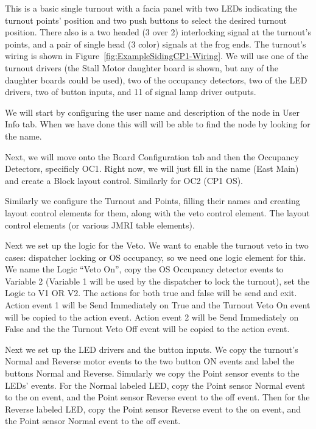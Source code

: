 This is a basic single turnout with a facia panel with two LEDs indicating the
turnout points' position and two push buttons to select the desired turnout
position. There also is a two headed (3 over 2) interlocking signal at the
turnout's points, and a pair of single head (3 color) signals at the frog
ends. The turnout's wiring is shown in 
Figure~\ref{fig:ExampleSidingCP1-Wiring}. We will use one of the turnout 
drivers (the Stall Motor daughter board is shown, but any of the daughter 
boards could be used), two of the occupancy detectors, two of the LED drivers, 
two of button inputs, and 11 of signal lamp driver outputs.

We will start by configuring the user name and description of the node in User 
Info tab.  When we have done this will will be able to find the node by 
looking for the name.  

Next, we will move onto the Board Configuration tab and then the Occupancy
Detectors, specificly OC1. Right now, we will just fill in the name (East
Main) and create a Block layout control. Similarly for OC2 (CP1 OS).

Similarly we configure the Turnout and Points, filling their names and
creating layout control elements for them, along with the veto control
element. The layout control elements (or various JMRI table elements). 

Next we set up the logic for the Veto. We want to enable the turnout veto in
two cases: dispatcher locking or OS occupancy, so we need one logic element
for this. We name the Logic ``Veto On'', copy the OS Occupancy detector events
to Variable 2 (Variable 1 will be used by the dispatcher to lock the turnout),
set the Logic to V1 OR V2. The actions for both true and false will be send
and exit. Action event 1 will be Send Immediately on True and the Turnout Veto
On event will be copied to the action event. Action event 2 will be Send
Immediately on False and the the Turnout Veto Off event will be copied to the
action event.

Next we set up the LED drivers and the button inputs. We copy the turnout's
Normal and Reverse motor events to the two button ON events and label the
buttons Normal and Reverse. Simularly we copy the Point sensor events to the
LEDs' events. For the Normal labeled LED, copy the Point sensor Normal event
to the on event, and the Point sensor Reverse event to the off event. Then for
the Reverse labeled LED, copy the Point sensor Reverse event to the on event, 
and the Point sensor Normal event to the off event.

